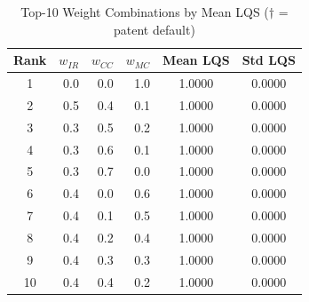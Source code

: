 \begin{table}[htbp]
\centering
\caption{Top-10 Weight Combinations by Mean LQS ($\dagger$ = patent default)}
\label{tab:top_weights}
\begin{tabular}{crrrcc}
\toprule
  Rank & $w_{IR}$ & $w_{CC}$ & $w_{MC}$ & Mean LQS & Std LQS \\
\midrule
  1 & 0.0 & 0.0 & 1.0 & 1.0000 & 0.0000 \\
  2 & 0.5 & 0.4 & 0.1 & 1.0000 & 0.0000 \\
  3 & 0.3 & 0.5 & 0.2 & 1.0000 & 0.0000 \\
  4 & 0.3 & 0.6 & 0.1 & 1.0000 & 0.0000 \\
  5 & 0.3 & 0.7 & 0.0 & 1.0000 & 0.0000 \\
  6 & 0.4 & 0.0 & 0.6 & 1.0000 & 0.0000 \\
  7 & 0.4 & 0.1 & 0.5 & 1.0000 & 0.0000 \\
  8 & 0.4 & 0.2 & 0.4 & 1.0000 & 0.0000 \\
  9 & 0.4 & 0.3 & 0.3 & 1.0000 & 0.0000 \\
  10 & 0.4 & 0.4 & 0.2 & 1.0000 & 0.0000 \\
\bottomrule
\end{tabular}
\end{table}